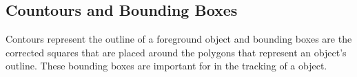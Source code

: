 
\subsection{Countours and Bounding Boxes}

Contours represent the outline of a foreground object and bounding boxes are the corrected squares that are placed around the polygons that represent an object's outline. These bounding boxes are important for in the tracking of a object.
